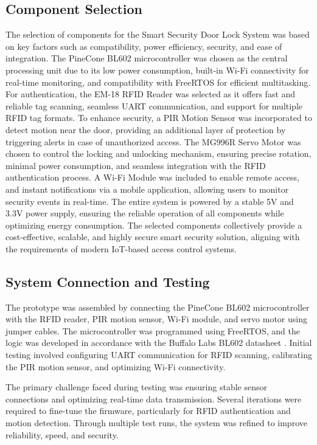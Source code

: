 \documentclass[a4paper]{scrartcl}
\begin{document}
\subsection{Component Selection}
The selection of components for the Smart Security Door Lock System was based on key factors such as compatibility, power efficiency, security, and ease of integration. The PineCone BL602 microcontroller was chosen as the central processing unit due to its low power consumption, built-in Wi-Fi connectivity for real-time monitoring, and compatibility with FreeRTOS\cite{FreeRTOSWiki} for efficient multitasking. For authentication, the EM-18 RFID Reader was selected as it offers fast and reliable tag scanning, seamless UART\cite{UARTWiki} communication, and support for multiple RFID tag formats. To enhance security, a PIR Motion Sensor was incorporated to detect motion near the door, providing an additional layer of protection by triggering alerts in case of unauthorized access. The MG996R Servo Motor was chosen to control the locking and unlocking mechanism, ensuring precise rotation, minimal power consumption, and seamless integration with the RFID authentication process. A Wi-Fi Module was included to enable remote access, and instant notifications via a mobile application, allowing users to monitor security events in real-time. The entire system is powered by a stable 5V and 3.3V power supply, ensuring the reliable operation of all components while optimizing energy consumption. The selected components collectively provide a cost-effective, scalable, and highly secure smart security solution, aligning with the requirements of modern IoT-based access control systems.

\subsection{System Connection and Testing}

The prototype was assembled by connecting the PineCone BL602 microcontroller with the RFID reader, PIR motion sensor, Wi-Fi module, and servo motor using jumper cables. The microcontroller was programmed using FreeRTOS, and the logic was developed in accordance with the Buffalo Labs BL602 datasheet \cite{PINE64}. Initial testing involved configuring UART communication for RFID scanning, calibrating the PIR motion sensor, and optimizing Wi-Fi connectivity.

The primary challenge faced during testing was ensuring stable sensor connections and optimizing real-time data transmission. Several iterations were required to fine-tune the firmware, particularly for RFID authentication and motion detection. Through multiple test runs, the system was refined to improve reliability, speed, and security.
\end{document}
